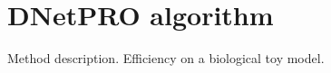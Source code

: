 \documentclass{standalone}
\begin{document}
\section[DNetPRO algorithm]{DNetPRO algorithm}\label{DNetPRO}

Method description.
Efficiency on a biological toy model.
\end{document}
